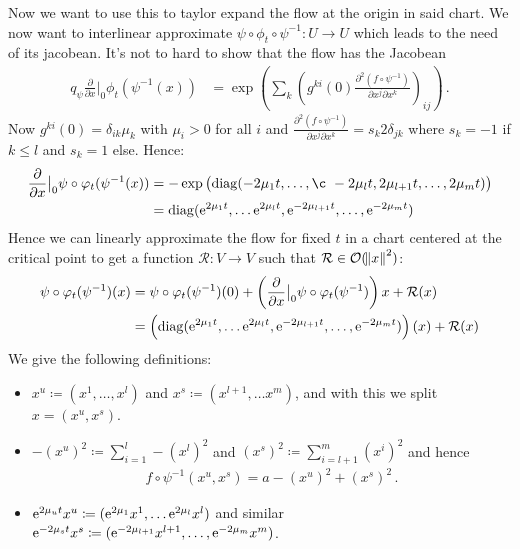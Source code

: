 \begin{remark} \label{rem: Linearly Approximate the Flow}
Now we want to use this to taylor expand the flow at the origin in said chart. 
 We now want to interlinear approximate  $\psi\circ \phi_t \circ \psi^{-1}:U\to U$ which leads to the need of its jacobean. It's not to hard to show that the flow has the Jacobean
\begin{align*}
	q_{\psi}	\frac{\partial}{\partial x}\big|_0 \phi_t(\psi^{-1}(x)	)
	&=\exp\left( \sum_k \left(g^{ki}(0) \frac{\partial ^2 (f\circ \psi^{-1})}{\partial x^j\partial x^k}\right)_{ij} \right) \, .
\end{align*} Now $g^{ki}(0)=\delta_{ik}\mu_k$ with $\mu_i>0$ for all $i$ and $\frac{\partial ^2 (f\circ \psi^{-1})}{\partial x^j\partial x^k}=s_{k} 2\delta_{jk}$ where $s_{k}=-1$ if $k\leq l$ and $s_k=1$ else. Hence: 
\begin{align*}
	\frac{\partial}{\partial x}\big|_0 \psi\circ \phi_t(\psi^{-1}(x)	)&=-\exp\left(\diag(-2\mu_1t,\dots,¸ -2\mu_lt,2\mu_{l+1}t,\dots,2\mu_mt)\right)\\ 
	&=\diag(\euler^{2\mu_{1}t},\dots \euler^{2\mu_{l}t},\euler^{-2\mu_{l+1}t},\dots,\euler^{-2\mu_{m}t}) 
\end{align*}
Hence we can linearly approximate the flow for fixed $t$ in a chart centered at the critical point to get a function $\mathcal{R}:V\to V$ such that $\mathcal{R}\in \mathcal{O}(\norm{x}^2)$:
\begin{align*}
	\psi\circ \varphi_t(\psi^{-1})(x)
	&=\psi\circ \varphi_t(\psi^{-1})(0)+\left( \frac{\partial}{\partial x}\big|_0	\psi\circ \varphi_t(\psi^{-1})\right) x+\mathcal{R}(x)\\
	&=\left( \mathrm{diag}(\mathrm{e}^{2\mu_{1}t},\dots \mathrm{e}^{2\mu_{l}t},\mathrm{e}^{-2\mu_{l+1}t},\dots,\mathrm{e}^{-2\mu_{m}t}) \right)(x) +\mathcal{R}(x)
\end{align*}
We give the following definitions: 
\begin{itemize}
	\item $x^u\coloneq (x^1,\dots,x^l)$ and $x^s \coloneq (x^{l+1},\dots x^m)$, and with this we split $x=(x^u,x^s)$.
	\item $-(x^{u})^2\coloneq \sum _{i=1}^l-(x^l)^2$ and $(x^{s})^2\coloneq \sum_{i=l+1}^m (x^i)^2$ and hence 
	\begin{align*}
		f\circ\psi^{-1}(x^u,x^s)=a-(x^{u})^2+(x^{s})^2\, .
	\end{align*} 
	\item  $\mathrm{e}^{2\mu_u t}x^u\coloneq(\mathrm{e}^{2\mu_{1}}x^1,\dots \mathrm{e}^{2\mu_{l}}x^l)$ and similar $\mathrm{e}^{-2\mu_s t }x^s\coloneq (\mathrm{e}^{-2\mu_{l+1}}x^{l+1},\dots,\mathrm{e}^{-2\mu_{m}}x^m)$.

\end{itemize}
\end{remark}
